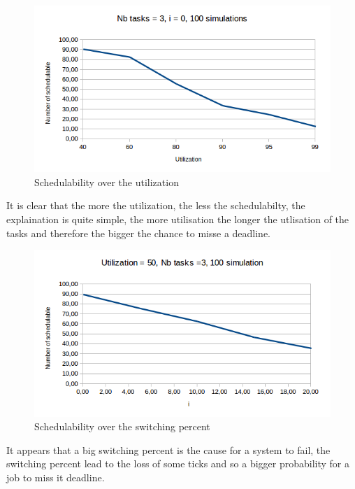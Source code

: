 \documentclass[a4paper,12pt]{article}
\begin{document}
\begin{figure}[H]
	\begin{center}
		\includegraphics{schedU.png}
	\end{center}
	\label{sched}
	\caption{Schedulability over the utilization}
\end{figure}
It is clear that the more the utilization, the less the schedulabilty, the explaination is quite simple, the more utilisation the longer the utlisation of the tasks and therefore the bigger the chance to misse a deadline.

\begin{figure}[H]
	\begin{center}
		\includegraphics{schedI.png}
	\end{center}
	\label{sched}
	\caption{Schedulability over the switching percent}
\end{figure}

It appears that a big switching percent is the cause for a system to fail, the switching percent lead to the loss of some ticks and so a bigger probability for a job to miss it deadline.
\end{document}
